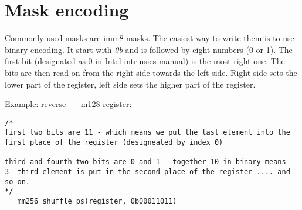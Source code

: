 \documentclass[openany, longbibliography,slovene,a4paper,12pt]{article}
\begin{document}
\section{Mask encoding}
Commonly used masks are imm8 masks. The easiest way to write them is
to use binary encoding. It start with \emph{0b} and is followed by
eight numbers (0 or 1). The first bit (designated as 0 in Intel
intrinsics manual) is the most right one. The bits are then read on
from the right side towards the left side. Right side sets the
lower part of the register, left side sets the higher part of the register.

Example: reverse __m128 register:

\begin{verbatim}
/*
first two bits are 11 - which means we put the last element into the
first place of the register (designeated by index 0)

third and fourth two bits are 0 and 1 - together 10 in binary means
3- third element is put in the second place of the register .... and
so on.
*/
  _mm256_shuffle_ps(register, 0b00011011)
\end{verbatim}
\end{document}
